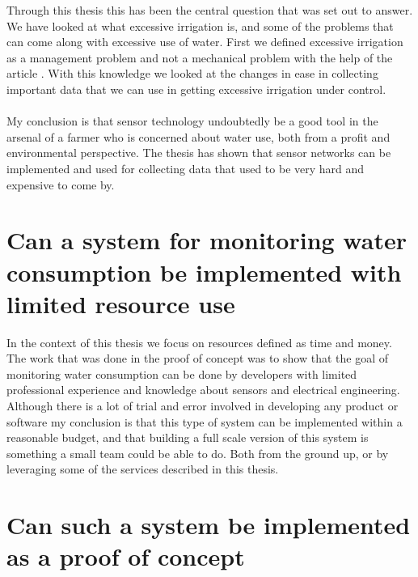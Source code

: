 \documentclass[]{uiophd}
\begin{document}
Through this thesis this has been the central question that was set out to answer. We have looked at what excessive irrigation is, and some of the problems that can come along with excessive use of water. First we defined excessive irrigation as a management problem and not a mechanical problem with the help of the article \cite{LILIENFELD200773}. With this knowledge we looked at the changes in ease in collecting important data that we can use in getting excessive irrigation under control. 
\\\\
My conclusion is that sensor technology undoubtedly be a good tool in the arsenal of a farmer who is concerned about water use, both from a profit and environmental perspective. The thesis has shown that sensor networks can be implemented and used for collecting data that used to be very hard and expensive to come by.

\section{ Can a system for monitoring water consumption be implemented with limited resource use}

In the context of this thesis we focus on resources defined as time and money. The work that was done in the proof of concept was to show that the goal of monitoring water consumption can be done by developers with limited professional experience and knowledge about sensors and electrical engineering. Although there is a lot of trial and error involved in developing any product or software my conclusion is that this type of system can be implemented within a reasonable budget, and that building a full scale version of this system is something a small team could be able to do. Both from the ground up, or by leveraging some of the services described in this thesis.

\section{ Can such a system be implemented as a proof of concept}
\end{document}
